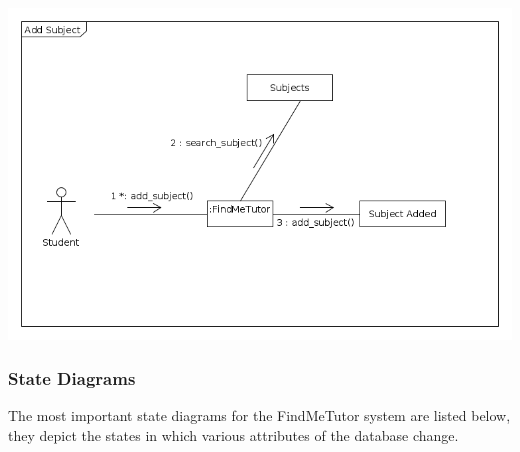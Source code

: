 \documentclass[12pt]{article}
\begin{document}
\includegraphics[width=140mm]{./communication_diagram/communication_diagram_as.png}
\newpage
\subsubsection{State Diagrams}
The most important state diagrams for the FindMeTutor system are listed below, they depict the states in which various attributes of the database change.\\
\end{document}
